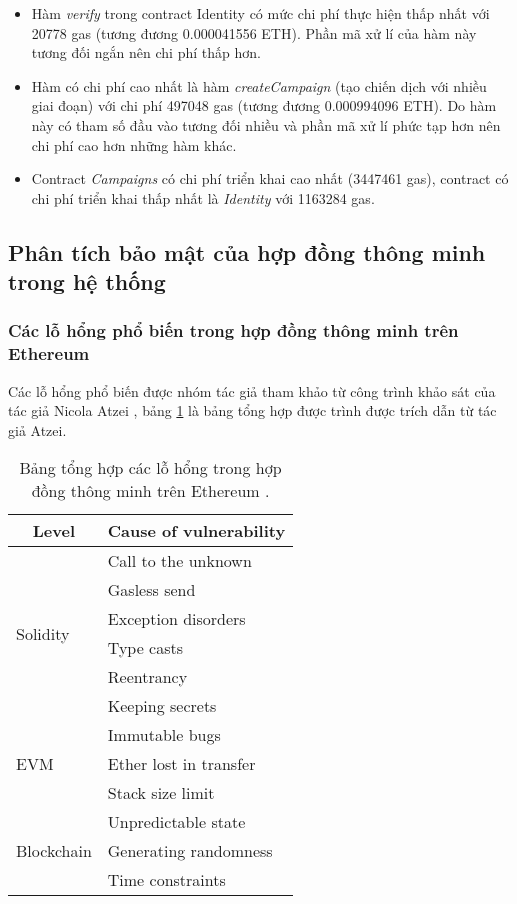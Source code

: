 \documentclass[../main-report.tex]{subfiles}
\begin{document}
\begin{itemize}
\item Hàm \textit{verify} trong contract Identity có mức chi phí thực hiện thấp nhất với 20778 gas (tương đương 0.000041556 ETH). Phần mã xử lí của hàm này tương đối ngắn nên chi phí thấp hơn.
\item Hàm có chi phí cao nhất là hàm \textit{createCampaign} (tạo chiến dịch với nhiều giai đoạn) với chi phí 497048 gas (tương đương 0.000994096 ETH). Do hàm này có tham số đầu vào tương đối nhiều và phần mã xử lí phức tạp hơn nên chi phí cao hơn những hàm khác.
\item Contract \textit{Campaigns} có chi phí triển khai cao nhất (3447461 gas), contract có chi phí triển khai thấp nhất là \textit{Identity} với 1163284 gas.
\end{itemize}
\subsection{Phân tích bảo mật của hợp đồng thông minh trong hệ thống}
\subsubsection{Các lỗ hổng phổ biến trong hợp đồng thông minh trên Ethereum}
Các lỗ hổng phổ biến được nhóm tác giả tham khảo từ công trình khảo sát của tác giả Nicola Atzei \cite{atzei2016survey}, bảng \ref{tab:smartcontract-vuln} là bảng tổng hợp được trình được trích dẫn từ tác giả Atzei.

\begin{table}[!ht]
\centering
\begin{tabular}{|l|l|}
\hline
\multicolumn{1}{|c|}{\textbf{Level}} & \multicolumn{1}{c|}{\textbf{Cause of vulnerability}} \\ \hline
\multirow{6}{*}{Solidity} & Call to the unknown \\ \cline{2-2} 
 & Gasless send \\ \cline{2-2} 
 & Exception disorders \\ \cline{2-2} 
 & Type casts \\ \cline{2-2} 
 & Reentrancy \\ \cline{2-2} 
 & Keeping secrets \\ \hline
\multirow{3}{*}{EVM} & Immutable bugs \\ \cline{2-2} 
 & Ether lost in transfer \\ \cline{2-2} 
 & Stack size limit \\ \hline
\multirow{3}{*}{Blockchain} & Unpredictable state \\ \cline{2-2} 
 & Generating randomness \\ \cline{2-2} 
 & Time constraints \\ \hline
\end{tabular}
\caption[Bảng tổng hợp các lỗ hổng trong hợp đồng thông minh trên Ethereum]{Bảng tổng hợp các lỗ hổng trong hợp đồng thông minh trên Ethereum \cite{atzei2016survey}.}
\label{tab:smartcontract-vuln}
\end{table}
\end{document}
